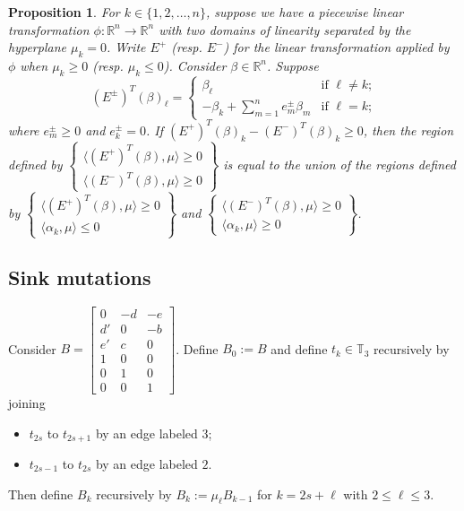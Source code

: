 \documentclass{amsart}
\newtheorem{proposition}[theorem]{Proposition}
\numberwithin{theorem}{section}
\newcommand{\RR}{\mathbb{R}}
\newcommand{\TT}{\mathbb{T}}
\begin{document}
  \begin{proposition}
    For $k\in\{1,2,\ldots,n\}$, suppose we have a piecewise linear transformation $\phi:\RR^n\to\RR^n$ with two domains of linearity separated by the hyperplane $\mu_k = 0$.
    Write $E^+$ (resp. $E^-$) for the linear transformation applied by $\phi$ when $\mu_k\ge0$ (resp. $\mu_k\le 0$).
    Consider $\beta\in\RR^n$.
    Suppose 
    \[(E^\pm)^T(\beta)_\ell=\begin{cases} \beta_\ell & \text{if $\ell\ne k$;}\\ -\beta_k+\sum_{m=1}^n e^\pm_m \beta_m & \text{if $\ell=k$;}\end{cases}\]
    where $e^\pm_m\ge0$ and $e^\pm_k=0$.
    If $(E^+)^T(\beta)_k-(E^-)^T(\beta)_k\ge 0$, then the region defined by $\left\{\substack{\langle (E^+)^T(\beta),\mu\rangle \ge 0\\ \langle (E^-)^T(\beta),\mu\rangle \ge 0}\right\}$ is equal to the union of the regions defined by $\left\{\substack{\langle (E^+)^T(\beta),\mu\rangle \ge 0\\ \langle \alpha_k,\mu\rangle \le 0}\right\}$ and $\left\{\substack{\langle (E^-)^T(\beta),\mu\rangle \ge 0\\ \langle \alpha_k,\mu\rangle \ge 0}\right\}$.
  \end{proposition}

  \subsection{Sink mutations}

  Consider $B=\left[\begin{array}{ccc} 0 & -d & -e \\ d' & 0 & -b\\ e' & c & 0\\ 1 & 0 & 0\\ 0 & 1 & 0\\ 0 & 0 & 1\end{array}\right]$.
  Define $B_0:=B$ and define $t_k\in\TT_3$ recursively by joining 
  \begin{itemize}
    \item $t_{2s}$ to $t_{2s+1}$ by an edge labeled $3$;
    \item $t_{2s-1}$ to $t_{2s}$ by an edge labeled $2$.
  \end{itemize}
  Then define $B_k$ recursively by $B_k:=\mu_\ell B_{k-1}$ for $k=2s+\ell$ with $2\le\ell\le 3$.
\end{document}
